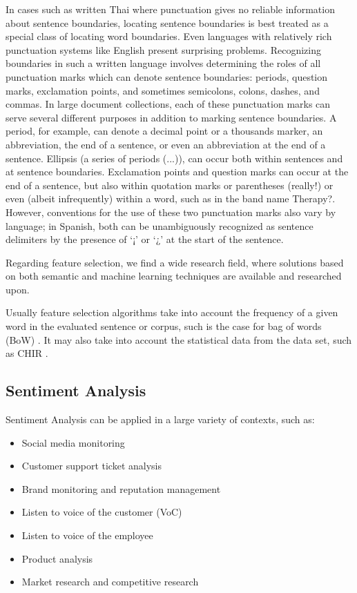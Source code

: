\documentclass[runningheads]{llncs}
\begin{document}
In cases such as written Thai where punctuation gives no reliable information about sentence boundaries, locating sentence boundaries is best treated as a special class of locating word boundaries. Even languages with relatively rich punctuation systems like English present surprising problems. 
Recognizing boundaries in such a written language involves determining the roles of all punctuation marks which can denote sentence boundaries: periods, question marks, exclamation points, and sometimes semicolons, colons, dashes, and commas. In large document collections, each of these punctuation marks can serve several different purposes in addition to marking sentence boundaries. A period, for example, can denote a decimal point or a thousands marker, an abbreviation, the end of a sentence, or even an abbreviation at the end of a sentence. Ellipsis (a series of periods (...)), can occur both within sentences and at sentence boundaries. Exclamation points and question marks can occur at the end of a sentence, but also within quotation marks or parentheses (really!) or even (albeit infrequently) within a word, such as in the band name Therapy?. However, conventions for the use of these two punctuation marks also vary by language; in Spanish, both can be unambiguously recognized as sentence delimiters by the presence of `¡' or `¿' at the start of the sentence. 

Regarding feature selection, we find a wide research field, where solutions based on both semantic and machine learning techniques are available and researched upon. 

Usually feature selection algorithms take into account the frequency of a given word in the evaluated sentence or corpus, such is the case for bag of words (BoW) \cite{McTear_Callejas_Griol_2016}. It may also take into account the statistical data from the data set, such as CHIR \cite{Li2008TextCW}.

\subsection{Sentiment Analysis}

Sentiment Analysis can be applied in a large variety of contexts, such as:

\begin{itemize}
	\item Social media monitoring 
	\item Customer support ticket analysis 
	\item Brand monitoring and reputation management 
	\item Listen to voice of the customer (VoC) 
	\item Listen to voice of the employee 
	\item Product analysis 
	\item Market research and competitive research 
\end{itemize}
\end{document}
